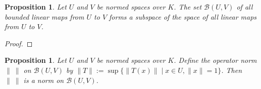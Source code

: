 \documentclass{book}
\let\qed\relax
\newtheorem{prop}[ax]{Proposition}
\theoremstyle{definition}
\begin{document}
\begin{prop}
Let $U$ and $V$ be normed spaces over $K$. The set $\mathcal{B}(U,V)$ of all bounded linear maps from $U$ to $V$ forms a subspace of the space of all linear maps from $U$ to $V$.
\end{prop}

\begin{proof}
\pf
{}
\qed
\end{proof}

\begin{prop}
Let $U$ and $V$ be normed spaces over $K$. Define the \emph{operator norm} $\|\ \|$ on $\mathcal{B}(U,V)$ by $\|T\| := \sup \{ \|T(x)\| \mid x \in U, \|x\| = 1 \}$. Then $\|\ \|$ is a norm on $\mathcal{B}(U,V)$.
\end{prop}
\end{document}
